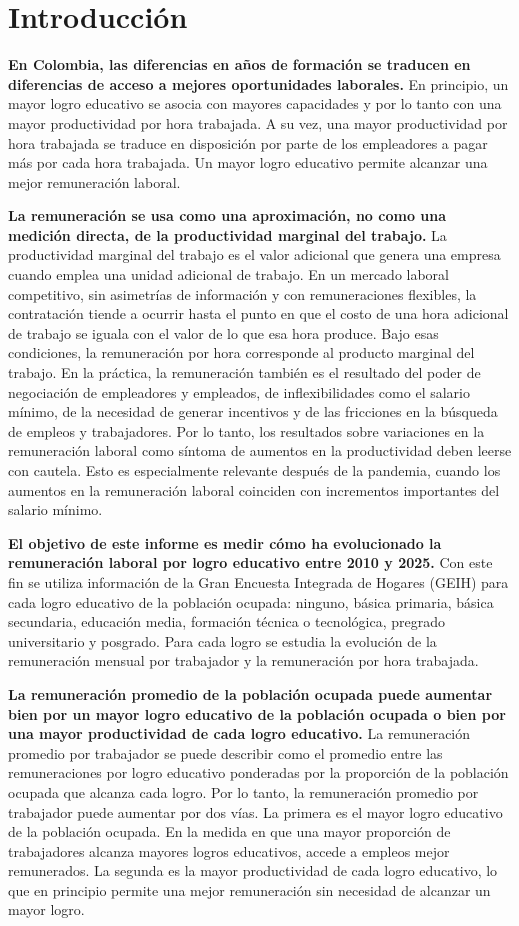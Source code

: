 \section{Introducción}\label{sec:introduccion}

\textbf{En Colombia, las diferencias en años de formación se traducen en diferencias de acceso a mejores oportunidades laborales.}  En principio, un mayor logro educativo se asocia con mayores capacidades y por lo tanto con una mayor productividad por hora trabajada. A su vez, una mayor productividad por hora trabajada se traduce en disposición por parte de los empleadores a pagar más por cada hora trabajada. Un mayor logro educativo permite alcanzar una mejor remuneración laboral.

\textbf{La remuneración se usa como una aproximación, no como una medición directa, de la productividad marginal del trabajo.} La productividad marginal del trabajo es el valor adicional que genera una empresa cuando emplea una unidad adicional de trabajo. En un mercado laboral competitivo, sin asimetrías de información y con remuneraciones flexibles, la contratación tiende a ocurrir hasta el punto en que el costo de una hora adicional de trabajo se iguala con el valor de lo que esa hora produce. Bajo esas condiciones, la remuneración por hora corresponde al producto marginal del trabajo. En la práctica, la remuneración también es el resultado del poder de negociación de empleadores y empleados, de inflexibilidades como el salario mínimo, de la necesidad de generar incentivos y de las fricciones en la búsqueda de empleos y trabajadores. Por lo tanto, los resultados sobre variaciones en la remuneración laboral como síntoma de aumentos en la productividad deben leerse con cautela. Esto es especialmente relevante después de la pandemia, cuando los aumentos en la remuneración laboral coinciden con incrementos importantes del salario mínimo.


\textbf{El objetivo de este informe es medir cómo ha evolucionado la remuneración laboral por logro educativo entre 2010 y 2025.} Con este fin se utiliza información de la Gran Encuesta Integrada de Hogares (GEIH) para cada logro educativo de la población ocupada: ninguno, básica primaria, básica secundaria, educación media, formación técnica o tecnológica, pregrado universitario y posgrado. Para cada logro se estudia la evolución de la remuneración mensual por trabajador y la remuneración por hora trabajada.

\textbf{La remuneración promedio de la población ocupada puede aumentar bien por un mayor logro educativo de la población ocupada o bien por una mayor productividad de cada logro educativo.} La remuneración promedio por trabajador se puede describir como el promedio entre las remuneraciones por logro educativo ponderadas por la proporción de la población ocupada que alcanza cada logro. Por lo tanto, la remuneración promedio por trabajador puede aumentar por dos vías. La primera es el mayor logro educativo de la población ocupada. En la medida en que una mayor proporción de trabajadores alcanza mayores logros educativos, accede a empleos mejor remunerados. La segunda es la mayor productividad de cada logro educativo, lo que en principio permite una mejor remuneración sin necesidad de alcanzar un mayor logro.

